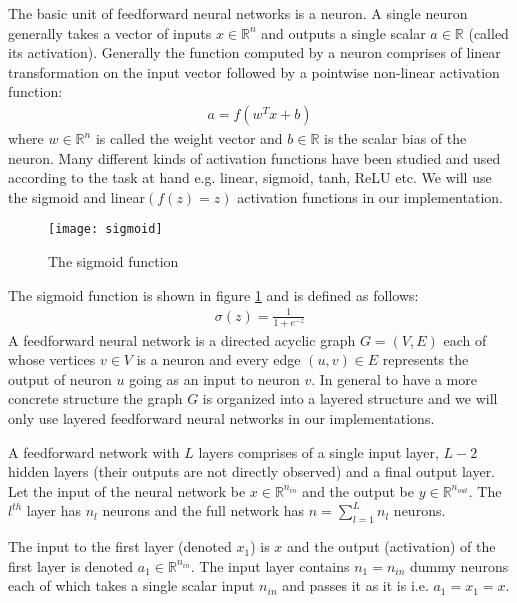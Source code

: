 The basic unit of feedforward neural networks is a neuron. A single neuron generally takes a vector of inputs $x \in \mathbb{R}^n$ and outputs a single scalar $a \in \mathbb{R}$ (called its activation). Generally the function computed by a neuron comprises of linear transformation on the input vector followed by a pointwise non-linear activation function:
\begin{align}
a = f(w^T x + b)
\end{align}
where $w \in \mathbb{R}^n$ is called the weight vector and $b \in \mathbb{R}$ is the scalar bias of the neuron.
Many different kinds of activation functions have been studied and used according to the task at hand e.g. linear, sigmoid, tanh, ReLU etc. We will use the sigmoid and linear$(f(z) = z)$ activation functions in our implementation.

\begin{figure}[ht]
\begin{center}
\centerline{\texttt{[image: sigmoid]}}
\caption{The sigmoid function}
\label{fig:sigmoid}
\end{center}
\vskip -0.4in
\end{figure}

The sigmoid function is shown in figure \ref{fig:sigmoid} and is defined as follows:
\begin{align}
\sigma(z) = \frac{1}{1 + e^{-z}}
\end{align}
A feedforward neural network is a directed acyclic graph $G = (V,E)$ each of whose vertices $v \in V$ is a neuron and every edge $(u,v) \in E$ represents the output of neuron $u$ going as an input to neuron $v$. In general to have a more concrete structure the graph $G$ is organized into a layered structure and we will only use layered feedforward neural networks in our implementations. 

A feedforward network with $L$ layers comprises of a single input layer, $L-2$ hidden layers (their outputs are not directly observed) and a final output layer.
Let the input of the neural network be $x \in \mathbb{R}^{n_{in}}$ and the output be $y \in \mathbb{R}^{n_{out}}$.
The $l^{th}$ layer has $n_l$ neurons and the full network has $n = \sum_{l=1}^L n_l$ neurons.

The input to the first layer (denoted $x_1$) is $x$ and the output (activation) of the first layer is denoted $a_1 \in \mathbb{R}^{n_{in}}$. The input layer contains $n_1 = n_{in}$ dummy neurons each of which takes a single scalar input $n_{in}$ and passes it as it is i.e. $a_1 = x_1 = x$.

